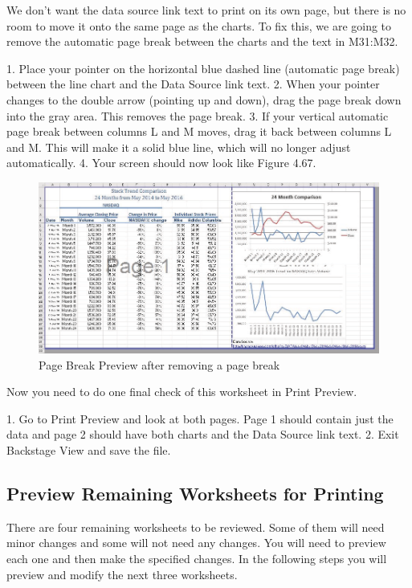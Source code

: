 We don’t want the data source link text to print on its own page, but there is no room to move it onto
the same page as the charts. To fix this, we are going to remove the automatic page break between the
charts and the text in M31:M32.

1. Place your pointer on the horizontal blue dashed line (automatic page break) between the line
chart and the Data Source link text.
2. When your pointer changes to the double arrow (pointing up and down), drag the page break
down into the gray area. This removes the page break.
3. If your vertical automatic page break between columns L and M moves, drag it back between
columns L and M. This will make it a solid blue line, which will no longer adjust automatically.
4. Your screen should now look like Figure 4.67.



\begin{figure}[H]
	\centering
	\includegraphics[width=\maxwidth{.95\linewidth}]{gfx/ch04_fig52}
	\caption{Page Break Preview after removing a page break}
	\label{04:fig52}
\end{figure}

Now you need to do one final check of this worksheet in Print Preview.

1. Go to Print Preview and look at both pages. Page 1 should contain just the data and page 2
should have both charts and the Data Source link text.
2. Exit Backstage View and save the file.

\subsection{Preview Remaining Worksheets for Printing}

There are four remaining worksheets to be reviewed. Some of them will need minor changes and
some will not need any changes. You will need to preview each one and then make the specified
changes. In the following steps you will preview and modify the next three worksheets.

